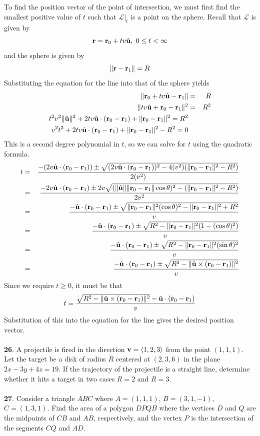 \documentclass[12pt]{amsbook}
\newcommand{\la}{\langle}
\newcommand{\ra}{\rangle}
\begin{document}
\\
\\ 
To find the position vector of the point of intersection, we must first find the smallest positive value of $t$ such that $\mathcal{L}|_{t}$ is a point on the sphere. Recall that $\mathcal{L}$ is given by
$${\bf r}={\bf r}_0+tv\hat{\bf u}, \ 0\leq t < \infty$$
and the sphere is given by
$$\|{\bf r}-{\bf r}_1\|=R$$
Substituting the equation for the line into that of the sphere yields
\begin{eqnarray*}
\|{\bf r}_0+tv\hat{\bf u}-{\bf r}_1\|&=&R\\
\|tv\hat{\bf u}+{\bf r}_0-{\bf r}_1\|^2&=&R^2\\
t^2v^2\|\hat{\bf u}\|^2+2tv\hat{\bf u}\cdot ({\bf r}_0-{\bf r}_1)+\|{\bf r}_0-{\bf r}_1\|^2=R^2\\
v^2t^2+2tv\hat{\bf u}\cdot ({\bf r}_0-{\bf r}_1)+\|{\bf r}_0-{\bf r}_1\|^2-R^2=0
\end{eqnarray*}
This is a second degree polynomial in $t$, so we can solve for $t$ using the quadratic formula.
\begin{eqnarray*}
t&=&\frac{-(2v\hat{\bf u}\cdot ({\bf r}_0-{\bf r}_1))\pm\sqrt{(2v\hat{\bf u}\cdot ({\bf r}_0-{\bf r}_1))^2-4(v^2)(\|{\bf r}_0-{\bf r}_1\|^2-R^2)}}{2(v^2)}\\
&=&\frac{-2v\hat{\bf u}\cdot ({\bf r}_0-{\bf r}_1)\pm 2v\sqrt{(\|\hat{\bf u}\|\|{\bf r}_0-{\bf r}_1\|\cos\theta)^2-(\|{\bf r}_0-{\bf r}_1\|^2-R^2)}}{2v^2}\\
&=&\frac{-\hat{\bf u}\cdot ({\bf r}_0-{\bf r}_1)\pm \sqrt{\|{\bf r}_0-{\bf r}_1\|^2(\cos\theta)^2-\|{\bf r}_0-{\bf r}_1\|^2+R^2}}{v}\\
&=&\frac{-\hat{\bf u}\cdot ({\bf r}_0-{\bf r}_1)\pm \sqrt{R^2-\|{\bf r}_0-{\bf r}_1\|^2(1-(\cos\theta)^2)}}{v}\\
&=&\frac{-\hat{\bf u}\cdot ({\bf r}_0-{\bf r}_1)\pm \sqrt{R^2-\|{\bf r}_0-{\bf r}_1\|^2(\sin\theta)^2}}{v}\\
&=&\frac{-\hat{\bf u}\cdot ({\bf r}_0-{\bf r}_1)\pm \sqrt{R^2-\|\hat{\bf u}\times({\bf r}_0-{\bf r}_1)\|^2}}{v}
\end{eqnarray*}
Since we require $t\geq 0$, it must be that 
$$t=\frac{\sqrt{R^2-\|\hat{\bf u}\times({\bf r}_0-{\bf r}_1)\|^2}-\hat{\bf u}\cdot ({\bf r}_0-{\bf r}_1)}{v}$$
Substitution of this into the equation for the line gives the desired position vector.
\\
\\
{\small\bf 26}. A projectile is fired in the direction
${\bf v}=\la 1,2,3\ra$ from the point $(1,1,1)$.
Let the target be a disk of radius $R$ centered at $(2,3,6)$
in the plane $2x-3y+4z=19$. If the trajectory of 
the projectile is a straight line, determine whether 
it hits a target in two cases $R=2$ and $R=3$. 
\\
\\
{\small\bf 27}. Consider a triangle $ABC$ where
$A=(1,1,1)$, $B=(3,1,-1)$, $C=(1,3,1)$. Find the area
of a polygon $DPQB$ where the vertices $D$ and $Q$ are
the midpoints of $CB$ and $AB$, respectively, and the 
vertex $P$ is the intersection of the segments $CQ$ and $AD$. 
\end{document}
